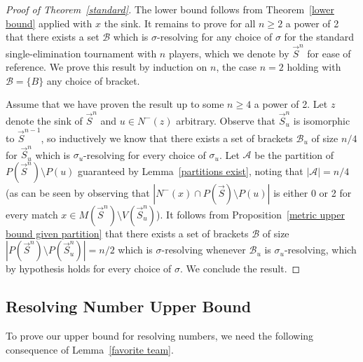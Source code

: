 \documentclass[12pt,letterpaper]{article}
\theoremstyle{definition}
\newcommand{\sig}{\sigma}
\renewcommand{\1}{\mathbbm{1}}
\newcommand{\sm}{\setminus}
\renewcommand{\c}[1]{\mathcal{#1}}
\renewcommand{\SS}[1]{\textcolor{red}{#1}}
\newcommand{\tour}{\vec{S}}
\begin{document}
\begin{proof}[Proof of Theorem~\ref{standard}]
	The lower bound follows from Theorem~\ref{lower bound} applied with $x$ the sink.  It remains to prove for all $n\ge 2$ a power of 2 that there exists a set $\c{B}$ which is $\sig$-resolving for any choice of $\sig$ for the standard single-elimination tournament with $n$ players, which we denote by $\tour^n$ for ease of reference.  We prove this result by induction on $n$, the case $n=2$ holding with $\c{B}=\{B\}$ any choice of bracket.
	
	Assume that we have proven the result up to some $n\ge 4$ a power of 2.  Let $z$ denote the sink of $\tour^n$ and $u\in N^-(z)$ arbitrary.  Observe that $\tour_u^n$ is isomorphic to $\tour^{n-1}$, so inductively we know that there exists a set of brackets $\c{B}_u$ of size $n/4$ for $\tour_u^n$ which is $\sig_u$-resolving for every choice of $\sig_u$.  Let $\c{A}$ be the partition of $P(\tour^n)\sm P(u)$ guaranteed by Lemma~\ref{partitions exist}, noting that $|\c{A}|=n/4$ (as can be seen by observing that $|N^-(x)\cap P(\tour)\sm P(u)|$ is either 0 or 2 for every match $x\in M(\tour^n)\sm V(\tour^n_u)$).  It follows from Proposition~\ref{metric upper bound given partition} that there exists a set of brackets $\c{B}$ of size $|P(\tour^n)\sm P(\tour^n_u)|=n/2$ which is $\sig$-resolving whenever $\c{B}_u$ is $\sig_u$-resolving, which by hypothesis holds for every choice of $\sig$.  We conclude the result.
\end{proof}

\subsection{Resolving Number Upper Bound}
To prove our upper bound for resolving numbers, we need the following consequence of Lemma~\ref{favorite team}.
\end{document}
